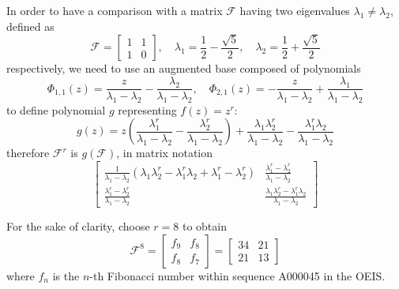 In order to have a comparison with a matrix $\mathcal{F}$ having two eigenvalues $\lambda_{1}\neq \lambda_{2}$,
defined as
\begin{displaymath}
\mathcal{F} = \left[\begin{matrix}1 & 1\\1 & 0\end{matrix}\right],
\quad  \lambda_{1} =  \frac{1}{2}- \frac{\sqrt{5}}{2} ,
\quad \lambda_{2} = \frac{1}{2} + \frac{\sqrt{5}}{2}
\end{displaymath}
respectively, we need to use an augmented base composed of polynomials
\begin{displaymath}
 \Phi_{ 1, 1 }{\left (z \right )} = \frac{z}{\lambda_{1} - \lambda_{2}} - \frac{\lambda_{2}}{\lambda_{1} - \lambda_{2}}, \quad  \Phi_{ 2, 1 }{\left (z \right )} = - \frac{z}{\lambda_{1} - \lambda_{2}} + \frac{\lambda_{1}}{\lambda_{1} - \lambda_{2}}
\end{displaymath}
to define polynomial $g$ representing $f(z)=z^{r}$:
\begin{displaymath}
g{\left (z \right )} = z \left(\frac{\lambda_{1}^{r}}{\lambda_{1} - \lambda_{2}} - \frac{\lambda_{2}^{r}}{\lambda_{1} - \lambda_{2}}\right) + \frac{\lambda_{1} \lambda_{2}^{r}}{\lambda_{1} - \lambda_{2}} - \frac{\lambda_{1}^{r} \lambda_{2}}{\lambda_{1} - \lambda_{2}}
\end{displaymath}
therefore $\mathcal{F}^{r}$ is $g(\mathcal{F})$, in matrix notation
\begin{displaymath}
\left[\begin{matrix}\frac{1}{\lambda_{1} - \lambda_{2}} \left(\lambda_{1} \lambda_{2}^{r} - \lambda_{1}^{r} \lambda_{2} + \lambda_{1}^{r} - \lambda_{2}^{r}\right) & \frac{\lambda_{1}^{r} - \lambda_{2}^{r}}{\lambda_{1} - \lambda_{2}}\\\frac{\lambda_{1}^{r} - \lambda_{2}^{r}}{\lambda_{1} - \lambda_{2}} & \frac{\lambda_{1} \lambda_{2}^{r} - \lambda_{1}^{r} \lambda_{2}}{\lambda_{1} - \lambda_{2}}\end{matrix}\right]
\end{displaymath}

For the sake of clarity, choose $r=8$ to obtain
    \begin{displaymath}
    \mathcal{F}^{8} = \left[\begin{matrix}f_{9} & f_{8}\\f_{8} & f_{7}\end{matrix}\right] = \left[\begin{matrix}34 & 21\\21 & 13\end{matrix}\right]
    \end{displaymath}
where $f_{n}$ is the $n$-th Fibonacci number within sequence A000045 in the OEIS.


